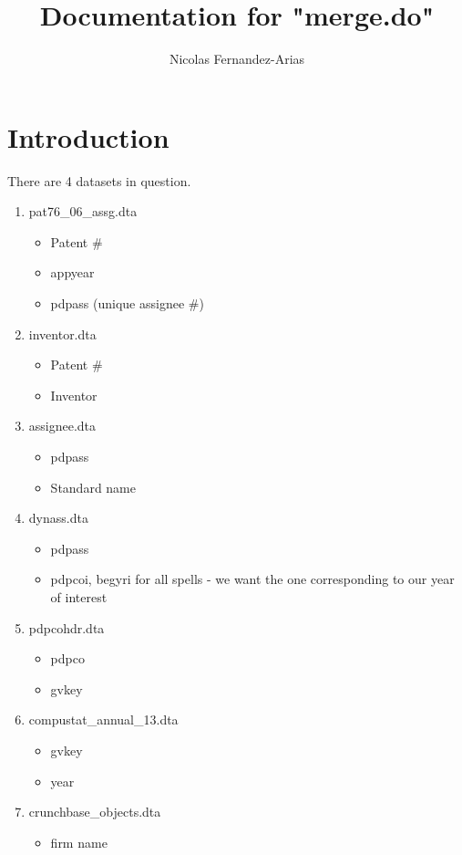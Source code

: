 \documentclass[12pt,english]{article}
\theoremstyle{remark}
\begin{document}
	
	\title{Documentation for "merge.do"}
	\author{Nicolas Fernandez-Arias}
	\maketitle

\section{Introduction}
There are 4 datasets in question.

\begin{enumerate}
	\item pat76\_06\_assg.dta
	\begin{itemize}
		\item Patent \#
		\item appyear
		\item pdpass (unique assignee \#) 
	\end{itemize}
	\item inventor.dta
	\begin{itemize}
		\item Patent \#
		\item Inventor
	\end{itemize}
	\item assignee.dta
	\begin{itemize}
		\item pdpass
		\item Standard name
	\end{itemize}
	\item dynass.dta
	\begin{itemize}
		\item pdpass
		\item pdpcoi, begyri for all spells - we want the one corresponding to our year of interest
	\end{itemize}
	\item pdpcohdr.dta
	\begin{itemize}
		\item pdpco
		\item gvkey
	\end{itemize}
	\item compustat\_annual\_13.dta
	\begin{itemize}
		\item gvkey
		\item year
		\end{itemize}
	\item crunchbase\_objects.dta
	\begin{itemize}
		\item firm name
	\end{itemize}
\end{enumerate}
\end{document}
